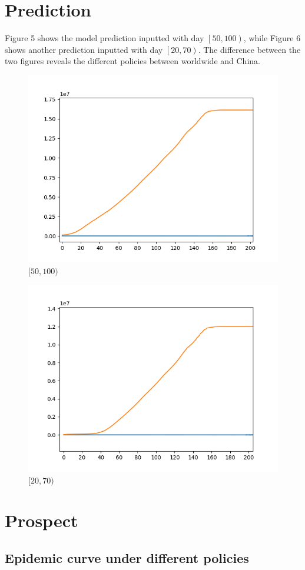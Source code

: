 \documentclass[]{article}
\begin{document}
\section{Prediction}
Figure 5 shows the model prediction inputted with day $\left[ 50, 100 \right)$, while Figure 6 shows another prediction inputted with day $\left[ 20, 70 \right)$. The difference between the two figures reveals the different policies between worldwide and China.
\begin{figure}[H]
	\centering
	\includegraphics[width=0.7\linewidth]{Figure_1}
	\caption{$[50, 100)$}
	\label{fig:figure1}
\end{figure}
\begin{figure}[H]
	\centering
	\includegraphics[width=0.7\linewidth]{Figure_2}
	\caption{$[20, 70)$}
	\label{fig:figure2}
\end{figure}

\section{Prospect}
\subsection{Epidemic curve under different policies}
\end{document}
